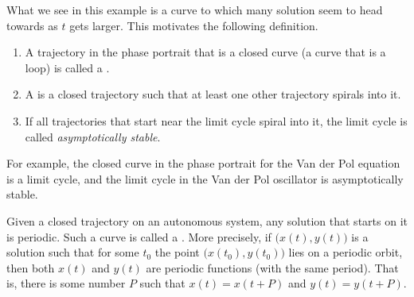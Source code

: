 \documentclass{ximera}
\begin{document}
What we see in this example is a curve to which many solution seem to head towards as $t$ gets larger. This motivates the following definition.

\begin{definition}
    \begin{enumerate}
        \item A trajectory in the phase portrait that is a closed curve (a curve that is a loop) is called a \emph{}.
        \item A \emph{} is a closed trajectory such that at least one other trajectory spirals into it. \item If all trajectories that start near the limit cycle spiral into it, the limit cycle is called \emph{asymptotically stable}.
    \end{enumerate}
\end{definition}
For example, the closed curve in the phase portrait for the Van der Pol equation is a limit cycle, and the limit cycle in the Van der Pol oscillator is asymptotically stable.

%

Given a closed trajectory on an autonomous system, any solution that starts on it is periodic. Such a curve is called a \emph{}. More precisely, if $\bigl(x(t),y(t)\bigr)$ is a solution such that for some $t_0$ the point $\bigl(x(t_0),y(t_0)\bigr)$ lies on a periodic orbit, then both $x(t)$ and $y(t)$ are periodic functions (with the same period).  That is, there is some number $P$ such that $x(t) = x(t+P)$ and $y(t) = y(t+P)$.
\end{document}
